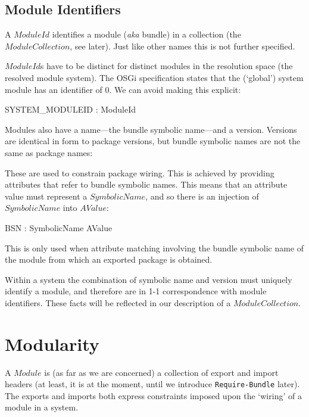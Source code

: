 \documentclass[a4paper,12pt]{article}
\begin{document}
\subsection{Module Identifiers}
A $ModuleId$ identifies a module (\emph{aka} bundle) in a collection (the $ModuleCollection$, see later). Just like other names this is not further specified.

\begin{zed}
 	[ModuleId]
\end{zed}
$ModuleId$s have to be distinct for distinct modules in the resolution space (the resolved module system). The OSGi specification states that the (`global') system module has an identifier of $0$. We can avoid making this explicit:
\begin{axdef}
 	SYSTEM\_MODULEID : ModuleId
\end{axdef}

Modules also have a name---the bundle symbolic name---and a version. Versions are identical in form to package versions, but bundle symbolic names are not the same as package names:
\begin{zed}
 	[SymbolicName]
\end{zed}
These are used to constrain package wiring. This is achieved by providing attributes that refer to bundle symbolic names. This means that an attribute value must represent a $SymbolicName$, and so there is an injection of $SymbolicName$ into $AValue$:
\begin{axdef}
 	BSN : SymbolicName \inj AValue
\end{axdef}
This is only used when attribute matching involving the bundle symbolic name of the module from which an exported package is obtained.

Within a system the combination of symbolic name and version must uniquely identify a module, and therefore are in 1-1 correspondence with module identifiers. These facts will be reflected in our description of a $ModuleCollection$.

\clearpage
\section{Modularity}
\label{cha:modularity}

A $Module$ is (as far as we are concerned) a collection of export and import headers (at least, it is at the moment, until we introduce {\tt Require-Bundle} later). The exports and imports both express constraints imposed upon the `wiring' of a module in a system.
\end{document}
